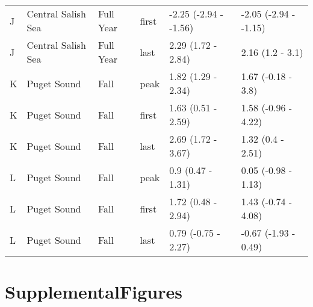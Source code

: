 \documentclass{article}
\begin{document}
\begin{table}[ht]
\begin{tabular}{|p{}|p{}|p{}|p{}|p{}|p{}|}
  J & Central Salish Sea & Full Year & first & -2.25 (-2.94 - -1.56) & -2.05 (-2.94 - -1.15) \\ 
  J & Central Salish Sea & Full Year & last & 2.29 (1.72 - 2.84) & 2.16 (1.2 - 3.1) \\ 
   \hline
K & Puget Sound & Fall & peak & 1.82 (1.29 - 2.34) & 1.67 (-0.18 - 3.8) \\ 
  K & Puget Sound & Fall & first & 1.63 (0.51 - 2.59) & 1.58 (-0.96 - 4.22) \\ 
  K & Puget Sound & Fall & last & 2.69 (1.72 - 3.67) & 1.32 (0.4 - 2.51) \\ 
   \hline
L & Puget Sound & Fall & peak & 0.9 (0.47 - 1.31) & 0.05 (-0.98 - 1.13) \\ 
  L & Puget Sound & Fall & first & 1.72 (0.48 - 2.94) & 1.43 (-0.74 - 4.08) \\ 
  L & Puget Sound & Fall & last & 0.79 (-0.75 - 2.27) & -0.67 (-1.93 - 0.49) \\ 
   \hline
\end{tabular}
\endgroup
\end{table}\section* {SupplementalFigures}

  
\end{document}
